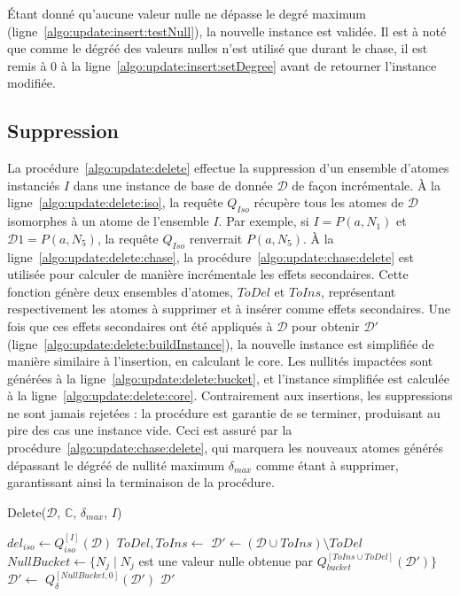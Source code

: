 \begin{example}
    Étant donné qu'aucune valeur nulle ne dépasse le degré maximum (ligne~\ref{algo:update:insert:testNull}), la nouvelle instance est validée.
    Il est à noté que comme le dégréé des valeurs nulles n'est utilisé que durant le \gls{chase}, il est remis à $0$ à la ligne~\ref{algo:update:insert:setDegree} avant de retourner l'instance modifiée.
\end{example}

\subsection{Suppression}
\label{sec:update:delete}
La procédure~\ref{algo:update:delete} effectue la suppression d'un ensemble d'atomes instanciés $I$ dans une instance de base de donnée $\mathcal{D}$ de façon incrémentale.
À la ligne~\ref{algo:update:delete:iso}, la requête $Q_{Iso}$ récupère tous les atomes de $\mathcal{D}$ isomorphes à un atome de l'ensemble $I$.
Par exemple, si $I = {P(a, N_1)}$ et $\mathcal{D}1= {P(a, N_5)}$, la requête $Q_{Iso}$ renverrait ${P(a, N_5)}$.
À la ligne~\ref{algo:update:delete:chase}, la procédure~\ref{algo:update:chase:delete} est utilisée pour calculer de manière incrémentale les effets secondaires.
Cette fonction génère deux ensembles d'atomes, $ToDel$ et $ToIns$, représentant respectivement les atomes à supprimer et à insérer comme effets secondaires.
Une fois que ces effets secondaires ont été appliqués à $\mathcal{D}$ pour obtenir $\mathcal{D}'$ (ligne~\ref{algo:update:delete:buildInstance}), la nouvelle instance est simplifiée de manière similaire à l'insertion, en calculant le \gls{core}.
Les nullités impactées sont générées à la ligne~\ref{algo:update:delete:bucket}, et l'instance simplifiée est calculée à la ligne~\ref{algo:update:delete:core}.
Contrairement aux insertions, les suppressions ne sont jamais rejetées : la procédure est garantie de se terminer, produisant au pire des cas une instance vide.
Ceci est assuré par la procédure~\ref{algo:update:chase:delete}, qui marquera les nouveaux atomes générés dépassant le dégréé de nullité maximum $\delta_{max}$ comme étant à supprimer, garantissant ainsi la terminaison de la procédure.

\begin{procedure}[ht]
    \caption{Delete($\mathcal{D}$, $\mathbb{C}$, $\delta_{max}$, $I$)}
    \label{algo:update:delete}

    $del_{iso} \gets Q_{iso}^{[I]}(\mathcal{D})$ \label{algo:update:delete:iso} \;
    $ToDel, ToIns \gets$  \label{algo:update:delete:chase} \;
    $\mathcal{D}' \gets (\mathcal{D} \cup ToIns) \setminus ToDel$ \label{algo:update:delete:buildInstance} \;
    $NullBucket \gets \{N_j \mid N_j$ est une valeur nulle obtenue par $Q_{bucket}^{[ToIns \cup ToDel]}(\mathcal{D}')\}$ \label{algo:update:delete:bucket} \;
    $\mathcal{D}' \gets$  \label{algo:update:delete:core} \;
    $Q_{\delta}^{[NullBucket,0]}(\mathcal{D}')$ \label{algo:update:delete:setDegree} \;
    \Return $\mathcal{D}'$
\end{procedure}

